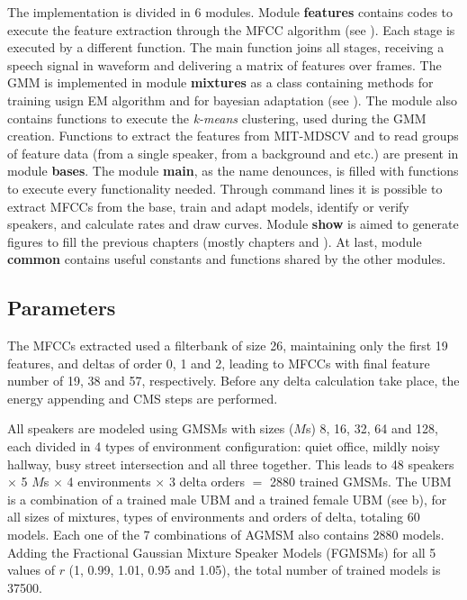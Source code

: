 The implementation is divided in 6 modules. Module \textbf{features} contains codes to execute the feature extraction through the MFCC algorithm (see ). Each stage is executed by a different function. The main function joins all stages, receiving a speech signal in waveform and delivering a matrix of features over frames. The GMM is implemented in module \textbf{mixtures} as a class containing methods for training usign EM algorithm and for bayesian adaptation (see ). The module also contains functions to execute the \emph{k-means} clustering, used during the GMM creation. Functions to extract the features from MIT-MDSCV and to read groups of feature data (from a single speaker, from a background and etc.) are present in module \textbf{bases}. The module \textbf{main}, as the name denounces, is filled with functions to execute every functionality needed. Through command lines it is possible to extract MFCCs from the base, train and adapt models, identify or verify speakers, and calculate rates and draw curves. Module \textbf{show} is aimed to generate figures to fill the previous chapters (mostly chapters  and ). At last, module \textbf{common} contains useful constants and functions shared by the other modules.

\subsection{Parameters}

The MFCCs extracted used a filterbank of size 26, maintaining only the first 19 features, and deltas of order 0, 1 and 2, leading to MFCCs with final feature number of 19, 38 and 57, respectively. Before any delta calculation take place, the energy appending and CMS steps are performed.

All speakers are modeled using GMSMs with sizes ($M$s) 8, 16, 32, 64 and 128, each divided in 4 types of environment configuration: quiet office, mildly noisy hallway, busy street intersection and all three together. This leads to 48 speakers $\times$ 5 $M$s $\times$ 4 environments $\times$ 3 delta orders $=$ 2880 trained GMSMs. The UBM is a combination of a trained male UBM and a trained female UBM (see b), for all sizes of mixtures, types of environments and orders of delta, totaling 60 models. Each one of the 7 combinations of AGMSM also contains 2880 models. Adding the Fractional Gaussian Mixture Speaker Models (FGMSMs) for all 5 values of $r$ (1, 0.99, 1.01, 0.95 and 1.05), the total number of trained models is 37500.

